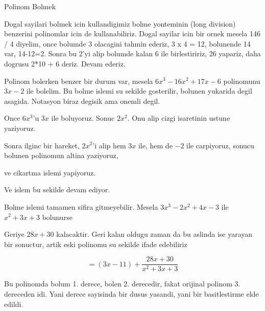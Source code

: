 \documentclass[12pt,fleqn]{article}
\begin{document}
Polinom Bolmek 

Dogal sayilari bolmek icin kullandigimiz bolme yonteminin (long division)
benzerini polinomlar icin de kullanabiliriz. Dogal sayilar icin bir ornek
mesela 146 / 4 diyelim, once bolumde 3 olacagini tahmin ederiz, 3 x 4 = 12,
bolunende 14 var, 14-12=2. Sonra bu 2'yi alip bolumde kalan 6 ile
birlestiririz, 26 yapariz, daha dogrusu 2*10 + 6 deriz. Devam ederiz. 

Polinom bolerken benzer bir durum var, mesela $6x^3-16x^2+17x-6$ polinomunu
$3x-2$ ile bolelim. Bu bolme islemi su sekilde gosterilir, bolunen yukarida
degil asagida. Notasyon biraz degisik ama onemli degil. 


Once $6x^3$'u $3x$ ile boluyoruz. Sonuc $2x^2$. Onu alip cizgi isaretinin
ustune yaziyoruz. 


Sonra ilginc bir hareket, $2x^2$'i alip hem $3x$ ile, hem de $-2$ ile
carpiyoruz, sonucu bolunen polinomun altina yaziyoruz, 


ve cikartma islemi yapiyoruz.


Ve islem bu sekilde devam ediyor. 


Bolme islemi tamamen sifira gitmeyebilir. Mesela $3x^3 - 2x^2 + 4x  - 3$
ile $x^2+3x+3$ bolunurse


Geriye $28x+30$ kalacaktir. Geri kalan oldugu zaman da bu aslinda ise
yarayan bir sonuctur, artik eski polinomu su sekilde ifade edebiliriz

\[=  (3x-11) + \frac{28x+30}{x^2+3x+3} \]

Bu polinomda bolum 1. derece, bolen 2. derecedir, fakat orijinal polinom
3. dereceden idi. Yani derece sayisinda bir dusus yasandi, yani bir
basitlestirme elde edildi. 
\end{document}
